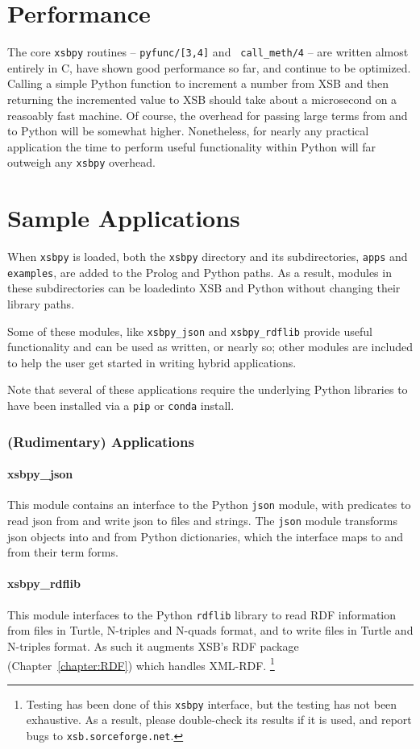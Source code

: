 \section{Performance}

The core {\tt xsbpy} routines -- {\tt pyfunc/[3,4]} and {\tt
  call\_meth/4} -- are written almost entirely in C, have shown good
performance so far, and continue to be optimized.  Calling a simple
Python function to increment a number from XSB and then returning the
incremented value to XSB should take about a microsecond on a
reasoably fast machine.  Of course, the overhead for passing large
terms from and to Python will be somewhat higher.  Nonetheless, for
nearly any practical application the time to perform useful
functionality within Python will far outweigh any {\tt xsbpy}
overhead.

\section{Sample Applications}
When {\tt xsbpy} is loaded, both the {\tt xsbpy} directory and its
subdirectories, {\tt apps} and {\tt examples}, are added to the Prolog
and Python paths.  As a result, modules in these subdirectories can be
loadedinto XSB and Python without changing their library paths.

Some of these modules, like {\tt xsbpy\_json} and {\tt xsbpy\_rdflib}
provide useful functionality and can be used as written, or nearly so;
other modules are included to help the user get started in writing
hybrid applications.

Note that several of these applications require the underlying Python
libraries to have been installed via a {\tt pip} or {\tt conda}
install.

\subsubsection{(Rudimentary) Applications}

\paragraph{xsbpy\_json}
This module contains an interface to the Python {\tt json}
module, with predicates to read json from and write json to files and
strings.  The {\tt json} module transforms json objects into and from Python
dictionaries, which the interface maps to and from their term forms.

\paragraph{xsbpy\_rdflib}
This module interfaces to the Python {\tt rdflib} library to read RDF
information from files in Turtle, N-triples and N-quads format, and to
write files in Turtle and N-triples format.  As such it augments XSB's
RDF package (Chapter~\ref{chapter:RDF}) which handles
XML-RDF. \footnote{Testing has been done of this {\tt xsbpy}
  interface, but the testing has not been exhaustive.  As a result,
  please double-check its results if it is used, and report bugs to
  {\tt xsb.sorceforge.net}.}


